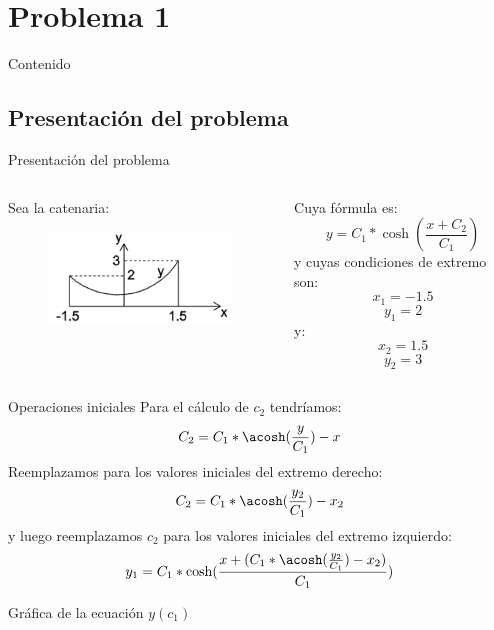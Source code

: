 \section{Problema 1}
\begin{frame}{Contenido}
        \tableofcontents[sections={2}]
\end{frame}

\subsection[Presentacion]{Presentación del problema}
\begin{frame}{Presentación del problema}
    \begin{columns}
        \begin{column}{0.47\textwidth}
            Sea la catenaria:
            \begin{figure}[h]
                \includegraphics[width=5cm]{Imagenes/Catenaria.png}
                \centering
            \end{figure}
        \end{column}
        \begin{column}{0.47\textwidth}
                Cuya fórmula es:                
                \[y=C_{1}*\cosh(\frac{x+C_{2}}{C_{1}})\]
                y cuyas condiciones de extremo son:
                \[x_{1}=-1.5 \]
                \[y_{1}=2 \]
                y:
                \[x_{2}=1.5 \]
                \[y_{2}=3 \]             
        \end{column}
    \end{columns}
\end{frame}
\begin{frame}{Operaciones iniciales}
    \centering
    Para el cálculo de $c_{2}$ tendríamos:                
                \[C_{2}=C_{1}*\acosh(\frac{y}{C_{1}})-x\]
    Reemplazamos para los valores iniciales del extremo derecho:
    \[C_{2}=C_{1}*\acosh(\frac{y_{2}}{C_{1}})-x_{2}\]
    y luego reemplazamos $c_{2}$ para los valores iniciales del extremo izquierdo:
    \[y_{1}=C_{1}*\cosh(\frac{x+(C_{1}*\acosh(\frac{y_{2}}{C_{1}})-x_{2})}{C_{1}})\]
\end{frame}

\begin{frame}{Gráfica de la ecuación $y(c_{1})$}
    \centering
\end{frame}
